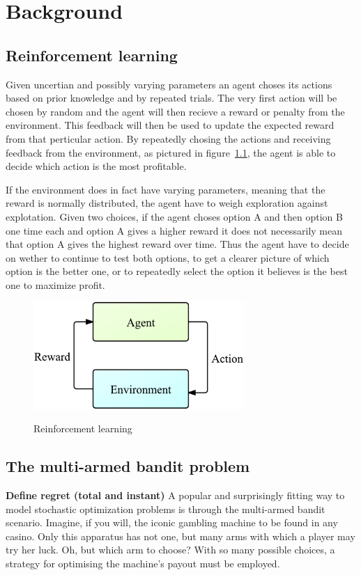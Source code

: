 \chapter{Background}
\label{ch:background}

\section{Reinforcement learning}
Given uncertian and possibly varying parameters an agent choses
its actions based on prior knowledge and by repeated trials. The very first action
will be chosen by random and the agent will then recieve a reward or
penalty from the environment. This feedback will then be used to update the expected reward
from that perticular action. By repeatedly chosing the actions and receiving feedback
from the environment, as pictured in figure~\ref{fig:rlearn}, the agent is able to
decide which action is the most profitable. 

If the environment does in fact have varying parameters, meaning that the reward
is normally distributed, the agent have to weigh exploration against
explotation. Given two choices, if the agent choses option A and then option B one time each and
option A gives a higher reward it does not necessarily mean that option A gives the highest
reward over time. Thus the agent have to decide on wether to continue
to test both options, to get a clearer picture of which option is the better one, or to repeatedly
select the option it believes is the best one to maximize profit. 

\begin{figure}[ht]
    \centering
    \includegraphics[width=8cm]{images/ReinforcementLearning}
    \label{fig:rlearn}
    \caption{Reinforcement learning}
\end{figure}

\section{The multi-armed bandit problem}
\textbf{Define regret (total and instant)}
A popular and surprisingly fitting way to model stochastic optimization problems 
is through the multi-armed bandit scenario. Imagine, if you will, the iconic 
gambling machine to be found in any casino. Only this apparatus has not one, but 
many arms with which a player may try her luck. Oh, but which arm to choose? 
With so many possible choices, a strategy for optimising the machine’s payout 
must be employed. 

